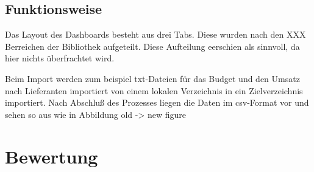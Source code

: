     \subsection{Funktionsweise}
    Das Layout des Dashboards besteht aus drei Tabs. Diese wurden nach den XXX Berreichen der Bibliothek aufgeteilt. Diese Aufteilung eerschien als sinnvoll,
    da hier nichts überfrachtet wird.

    Beim Import werden zum beispiel txt-Dateien für das Budget und den Umsatz nach Lieferanten importiert von einem lokalen Verzeichnis
    in ein Zielverzeichnis importiert. Nach Abschluß des Prozesses liegen die Daten im csv-Format vor und sehen so aus wie in Abbildung
    old -> new
    figure




\section{Bewertung}
